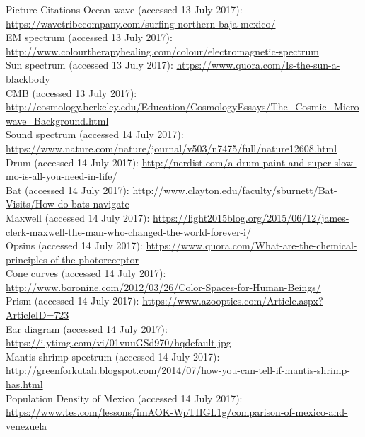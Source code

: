 \documentclass{beamer}
\begin{document}
\begin{frame}{Picture Citations}
Ocean wave (accessed 13 July 2017): \href{https://wavetribecompany.com/surfing-northern-baja-mexico/}{https://wavetribecompany.com/surfing-northern-baja-mexico/}\\
EM spectrum (accessed 13 July 2017): \href{http://www.colourtherapyhealing.com/colour/electromagnetic-spectrum}{http://www.colourtherapyhealing.com/colour/electromagnetic-spectrum}\\
Sun spectrum (accessed 13 July 2017): \href{https://www.quora.com/Is-the-sun-a-blackbody}{https://www.quora.com/Is-the-sun-a-blackbody}\\
CMB (accessed 13 July 2017): \href{http://cosmology.berkeley.edu/Education/CosmologyEssays/The\_Cosmic\_Microwave\_Background.html}{http://cosmology.berkeley.edu/Education/CosmologyEssays/The\_Cosmic\_Microwave\_Background.html}\\
Sound spectrum (accessed 14 July 2017): \href{https://www.nature.com/nature/journal/v503/n7475/full/nature12608.html}{https://www.nature.com/nature/journal/v503/n7475/full/nature12608.html}\\
Drum (accessed 14 July 2017): \href{http://nerdist.com/a-drum-paint-and-super-slow-mo-is-all-you-need-in-life/}{http://nerdist.com/a-drum-paint-and-super-slow-mo-is-all-you-need-in-life/}\\
Bat (accessed 14 July 2017): \href{http://www.clayton.edu/faculty/sburnett/Bat-Visits/How-do-bats-navigate}{http://www.clayton.edu/faculty/sburnett/Bat-Visits/How-do-bats-navigate}\\
Maxwell (accessed 14 July 2017): \href{https://light2015blog.org/2015/06/12/james-clerk-maxwell-the-man-who-changed-the-world-forever-i/}{https://light2015blog.org/2015/06/12/james-clerk-maxwell-the-man-who-changed-the-world-forever-i/}\\
Opsins (accessed 14 July 2017): \href{https://www.quora.com/What-are-the-chemical-principles-of-the-photoreceptor}{https://www.quora.com/What-are-the-chemical-principles-of-the-photoreceptor}\\
Cone curves (accessed 14 July 2017): \href{http://www.boronine.com/2012/03/26/Color-Spaces-for-Human-Beings/}{http://www.boronine.com/2012/03/26/Color-Spaces-for-Human-Beings/}\\
Prism (accessed 14 July 2017): \href{https://www.azooptics.com/Article.aspx?ArticleID=723}{https://www.azooptics.com/Article.aspx?ArticleID=723}\\
Ear diagram (accessed 14 July 2017): \href{https://i.ytimg.com/vi/01vuuGSd970/hqdefault.jpg}{https://i.ytimg.com/vi/01vuuGSd970/hqdefault.jpg}\\
Mantis shrimp spectrum (accessed 14 July 2017): \href{http://greenforkutah.blogspot.com/2014/07/how-you-can-tell-if-mantis-shrimp-has.html}{http://greenforkutah.blogspot.com/2014/07/how-you-can-tell-if-mantis-shrimp-has.html}\\
Population Density of Mexico (accessed 14 July 2017): \href{https://www.tes.com/lessons/imAOK-WpTHGL1g/comparison-of-mexico-and-venezuela}{https://www.tes.com/lessons/imAOK-WpTHGL1g/comparison-of-mexico-and-venezuela}
\end{frame}
\end{document}
